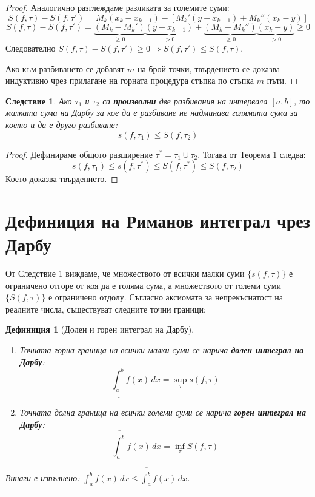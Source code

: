 \documentclass{scrartcl}
\newtheorem{definition}{Дефиниция}
\newtheorem{corollary}{Следствие}
\begin{document}
\begin{FlushLeft}
\begin{proof}
Аналогично разглеждаме разликата за големите суми:
\[ S(f, \tau) - S(f, \tau') = M_k(x_k - x_{k-1}) - \left[ M_k'(y - x_{k-1}) + M_k''(x_k - y) \right] \]
\[ S(f, \tau) - S(f, \tau') = \underbrace{(M_k - M_k')}_{\ge 0}\underbrace{(y - x_{k-1})}_{> 0} + \underbrace{(M_k - M_k'')}_{\ge 0}\underbrace{(x_k - y)}_{> 0} \ge 0 \]
Следователно $S(f, \tau) - S(f, \tau') \ge 0 \Rightarrow S(f, \tau') \le S(f, \tau)$.

Ако към разбиването се добавят $m$ на брой точки, твърдението се доказва индуктивно чрез прилагане на горната процедура стъпка по стъпка $m$ пъти.
\end{proof}

\begin{corollary}
Ако $\tau_1$ и $\tau_2$ са \textbf{произволни} две разбивания на интервала $[a, b]$, то малката сума на Дарбу за кое да е разбиване не надминава голямата сума за което и да е друго разбиване:
\[ s(f, \tau_1) \le S(f, \tau_2) \]
\end{corollary}
\begin{proof}
Дефинираме общото разширение $\tau^* = \tau_1 \cup \tau_2$. Тогава от Теорема 1 следва:
\[ s(f, \tau_1) \le s(f, \tau^*) \le S(f, \tau^*) \le S(f, \tau_2) \]
Което доказва твърдението.
\end{proof}

\newpage

\section{Дефиниция на Риманов интеграл чрез Дарбу}

От Следствие 1 виждаме, че множеството от всички малки суми $\{s(f, \tau)\}$ е ограничено отгоре от коя да е голяма сума, а множеството от големи суми $\{S(f, \tau)\}$ е ограничено отдолу. Съгласно аксиомата за непрекъснатост на реалните числа, съществуват следните точни граници:

\begin{definition}[Долен и горен интеграл на Дарбу]~
\begin{enumerate}
    \item Точната горна граница на всички малки суми се нарича \textbf{долен интеграл на Дарбу}:
    \[ \underline{\int_{a}^{b}} f(x)\,dx = \sup_{\tau} s(f, \tau) \]
    \item Точната долна граница на всички големи суми се нарича \textbf{горен интеграл на Дарбу}:
    \[ \overline{\int_{a}^{b}} f(x)\,dx = \inf_{\tau} S(f, \tau) \]
\end{enumerate}
Винаги е изпълнено: $\underline{\int_{a}^{b}} f(x)\,dx \le \overline{\int_{a}^{b}} f(x)\,dx$.
\end{definition}


\end{FlushLeft}
\end{document}
